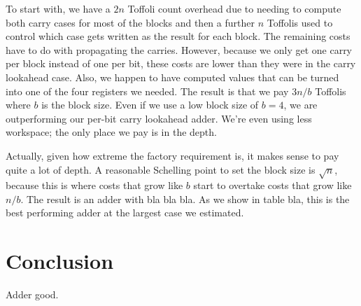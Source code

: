 \documentclass[onecolumn,unpublished]{quantumarticle}
\theoremstyle{definition}
\theoremstyle{definition}
\theoremstyle{definition}
\begin{document}
To start with, we have a $2n$ Toffoli count overhead due to needing to compute both carry cases for most of the blocks and then a further $n$ Toffolis used to control which case gets written as the result for each block.
The remaining costs have to do with propagating the carries.
However, because we only get one carry per block instead of one per bit, these costs are lower than they were in the carry lookahead case.
Also, we happen to have computed values that can be turned into one of the four registers we needed.
The result is that we pay $3n/b$ Toffolis where $b$ is the block size.
Even if we use a low block size of $b = 4$, we are outperforming our per-bit carry lookahead adder.
We're even using less workspace; the only place we pay is in the depth.

Actually, given how extreme the factory requirement is, it makes sense to pay quite a lot of depth.
A reasonable Schelling point to set the block size is $\sqrt{n}$, because this is where costs that grow like $b$ start to overtake costs that grow like $n/b$.
The result is an adder with bla bla bla.
As we show in table bla, this is the best performing adder at the largest case we estimated.


\section{Conclusion}

Adder good.



\end{document}
